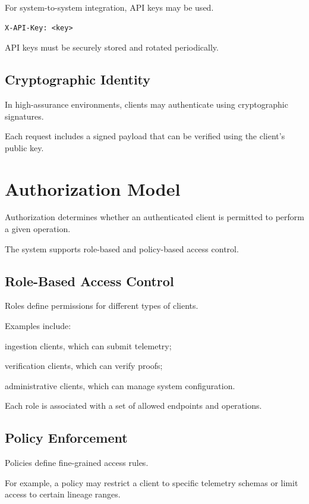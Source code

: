 For system-to-system integration, API keys may be used.

\begin{verbatim}
X-API-Key: <key>
\end{verbatim}

API keys must be securely stored and rotated periodically.

\subsection{Cryptographic Identity}

In high-assurance environments, clients may authenticate using cryptographic signatures.

Each request includes a signed payload that can be verified using the client’s public key.

\section{Authorization Model}

Authorization determines whether an authenticated client is permitted to perform a given operation.

The system supports role-based and policy-based access control.

\subsection{Role-Based Access Control}

Roles define permissions for different types of clients.

Examples include:

ingestion clients, which can submit telemetry;

verification clients, which can verify proofs;

administrative clients, which can manage system configuration.

Each role is associated with a set of allowed endpoints and operations.

\subsection{Policy Enforcement}

Policies define fine-grained access rules.

For example, a policy may restrict a client to specific telemetry schemas or limit access to certain lineage ranges.

